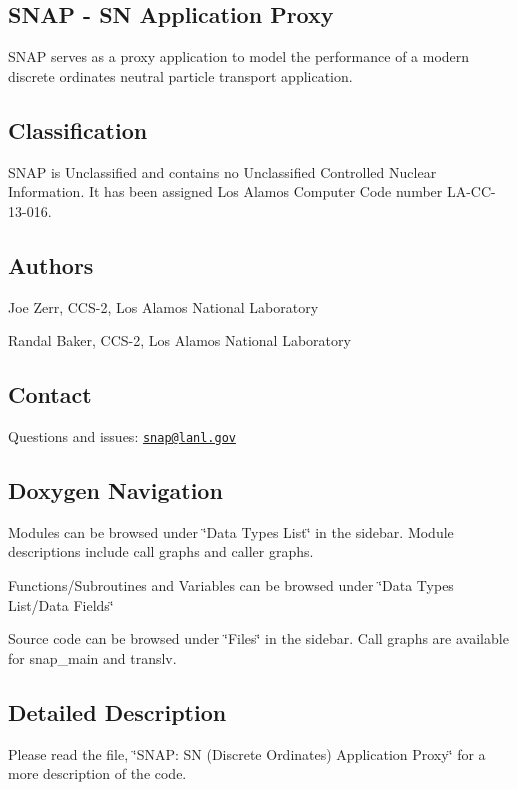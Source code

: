 \subsection*{S\-N\-A\-P -\/ S\-N Application Proxy}

S\-N\-A\-P serves as a proxy application to model the performance of a modern discrete ordinates neutral particle transport application.

\subsection*{Classification}

S\-N\-A\-P is Unclassified and contains no Unclassified Controlled Nuclear Information. It has been assigned Los Alamos Computer Code number L\-A-\/\-C\-C-\/13-\/016.

\subsection*{Authors}


\begin{DoxyItemize}
\item Joe Zerr, C\-C\-S-\/2, Los Alamos National Laboratory
\item Randal Baker, C\-C\-S-\/2, Los Alamos National Laboratory
\end{DoxyItemize}

\subsection*{Contact}

Questions and issues\-: \href{mailto:snap@lanl.gov}{\tt snap@lanl.\-gov}

\subsection*{Doxygen Navigation}

Modules can be browsed under \char`\"{}\-Data Types List\char`\"{} in the sidebar. Module descriptions include call graphs and caller graphs.

Functions/\-Subroutines and Variables can be browsed under \char`\"{}\-Data Types List/\-Data Fields\char`\"{}

Source code can be browsed under \char`\"{}\-Files\char`\"{} in the sidebar. Call graphs are available for snap\-\_\-main and translv.

\subsection*{Detailed Description}

Please read the file, \char`\"{}\-S\-N\-A\-P\-: S\-N (\-Discrete Ordinates) Application Proxy\char`\"{} for a more description of the code. 